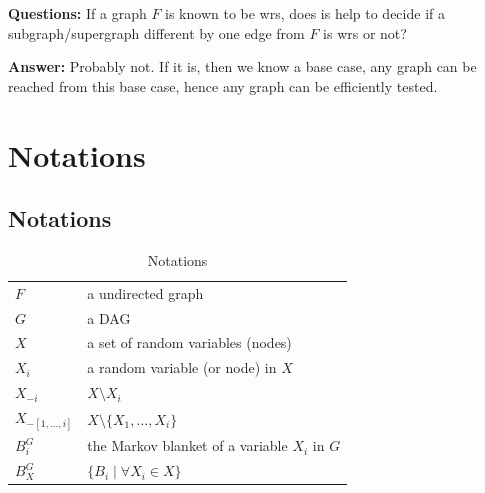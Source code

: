 \textbf{Questions:} If a graph $F$ is known to be wrs, does is help to decide if a subgraph/supergraph different by one edge from $F$ is wrs or not?

\textbf{Answer:} Probably not. If it is, then we know a base case, any graph can be reached from this base case, hence any graph can be efficiently tested. 

\section{Notations}
\subsection{Notations}
\begin{table}[]
\centering
\caption{Notations}
\label{my-label}
\begin{tabular}{ll}
\hline
$F$ &  a undirected graph \\
$G$ & a DAG \\
$X$ & a set of random variables (nodes) \\
$X_i$ & a random variable (or node) in $X$ \\
$X_{-i}$ & $X \setminus X_i$ \\ 
$X_{-[1,\dots, i]}$ & $X \setminus \{X_1, \dots, X_i\}$ \\ 
$B_i^G$ & the Markov blanket of a variable $X_i$ in $G$ \\ 
$B_X^G$ & $\{B_i \mid \forall X_i \in X\}$ \\ \hline
\end{tabular}
\end{table}




